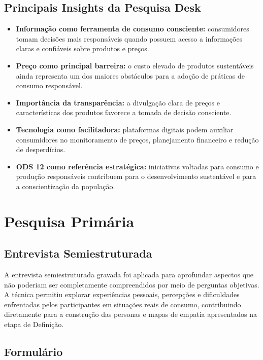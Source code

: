 \documentclass[12pt, a4paper]{article}
\newcommand{\novaSecao}[1]{\clearpage\vspace*{2.2cm}\section{#1}}
\begin{document}
\subsection{Principais Insights da Pesquisa Desk}

\begin{itemize}[leftmargin=1.4em, itemsep=8pt, label=\textcolor{wineSoft}{\textbf{\textbullet}}]
  \item \textbf{Informação como ferramenta de consumo consciente:} consumidores tomam decisões mais responsáveis quando possuem acesso a informações claras e confiáveis sobre produtos e preços.
  \item \textbf{Preço como principal barreira:} o custo elevado de produtos sustentáveis ainda representa um dos maiores obstáculos para a adoção de práticas de consumo responsável.
  \item \textbf{Importância da transparência:} a divulgação clara de preços e características dos produtos favorece a tomada de decisão consciente.
  \item \textbf{Tecnologia como facilitadora:} plataformas digitais podem auxiliar consumidores no monitoramento de preços, planejamento financeiro e redução de desperdícios.
  \item \textbf{ODS 12 como referência estratégica:} iniciativas voltadas para consumo e produção responsáveis contribuem para o desenvolvimento sustentável e para a conscientização da população.
\end{itemize}

\novaSecao{Pesquisa Primária}

\subsection{Entrevista Semiestruturada}

A entrevista semiestruturada gravada foi aplicada para aprofundar aspectos que não poderiam ser completamente compreendidos por meio de perguntas objetivas. A técnica permitiu explorar experiências pessoais, percepções e dificuldades enfrentadas pelos participantes em situações reais de consumo, contribuindo diretamente para a construção das personas e mapas de empatia apresentados na etapa de Definição.

\subsection{Formulário}
\end{document}
